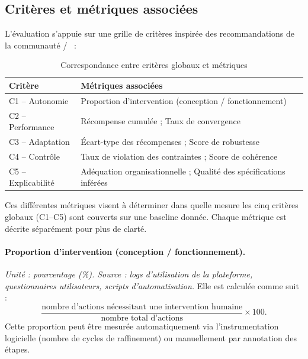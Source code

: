 \subsection{Critères et métriques associées}\label{sec:criteria_metrics}
L’évaluation s’appuie sur une grille de critères inspirée des recommandations de la communauté /~\cite{papoudakis2021agent} :

\begin{table}[h!]
    \centering
    \caption{Correspondance entre critères globaux et métriques}
    \begin{tabular}{ll}
        \hline
        \textbf{Critère}   & \textbf{Métriques associées}                                       \\
        \hline
        C1 – Autonomie     & Proportion d’intervention (conception / fonctionnement)            \\
        C2 – Performance   & Récompense cumulée ; Taux de convergence                           \\
        C3 – Adaptation    & Écart-type des récompenses ; Score de robustesse                   \\
        C4 – Contrôle      & Taux de violation des contraintes ; Score de cohérence             \\
        C5 – Explicabilité & Adéquation organisationnelle ; Qualité des spécifications inférées \\
        \hline
    \end{tabular}
    \label{tab:grille}
\end{table}

Ces différentes métriques visent à déterminer dans quelle mesure les cinq critères globaux (C1--C5) sont couverts sur une baseline donnée.
Chaque métrique est décrite séparément pour plus de clarté.

\paragraph{Proportion d’intervention (conception / fonctionnement).}
\textit{Unité : pourcentage (\%). Source : logs d’utilisation de la plateforme, questionnaires utilisateurs, scripts d’automatisation.}
Elle est calculée comme suit :
\[
    \frac{\text{nombre d’actions nécessitant une intervention humaine}}{\text{nombre total d’actions}} \times 100.
\]
Cette proportion peut être mesurée automatiquement via l’instrumentation logicielle (nombre de cycles de raffinement) ou manuellement par annotation des étapes.

